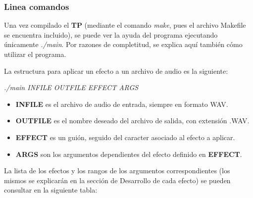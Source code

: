 \subsubsection{Linea comandos}
\label{subsec:cli}
Una vez compilado el \textbf{TP} (mediante el comando \textit{make}, pues el archivo Makefile se encuentra incluido), se puede ver la ayuda del programa ejecutando únicamente \textit{./main}. Por razones de completitud, se explica aquí también cómo utilizar el programa. \vspace{\baselineskip}

La estructura para aplicar un efecto a un archivo de audio es la siguiente:

\begin{center}\textit{./main INFILE OUTFILE EFFECT ARGS}\end{center}

\begin{itemize}
 \item \textbf{INFILE} es el archivo de audio de entrada, siempre en formato WAV.
 \item \textbf{OUTFILE} es el nombre deseado del archivo de salida, con extensión .WAV.
 \item \textbf{EFFECT} es un guión, seguido del caracter asociado al efecto a aplicar.
 \item \textbf{ARGS} son los argumentos dependientes del efecto definido en \textbf{EFFECT}.
\end{itemize}

La lista de los efectos y los rangos de los argumentos correspondientes (los mismos se explicarán en la sección  de Desarrollo de cada efecto) se pueden consultar en la siguiente tabla:\vspace{\baselineskip}

